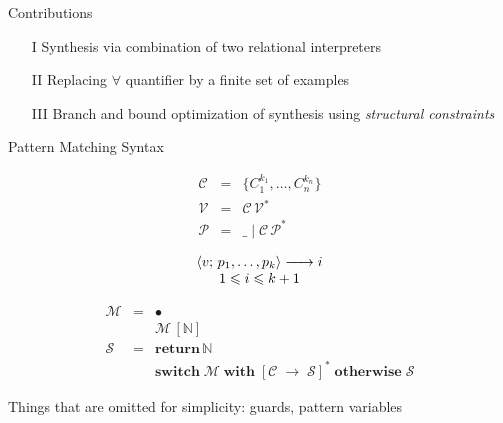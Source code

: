 \documentclass[aspectratio=169
  , xcolor={svgnames}
  , hyperref={ colorlinks,citecolor=Blue
             , linkcolor=DarkRed,urlcolor=DarkBlue}
  , russian
  ]{beamer}
\def\transarrow{\xrightarrow}
\def\padding{\phantom{X}}
\def\subarrow{}
\newcommand{\trans}[3]{{#1}\transarrow{\padding{\textstyle #2}\padding}\subarrow{#3}}
\newcommand{\inbr}[1]{\left<{#1}\right>}
\newcommand{\primi}[1]{\mathbf{#1}}
\newcommand{\ir}{\ensuremath{\mathcal{S}}}
\newcommand{\contributions}{
\begin{enumerate}
\item[I] Synthesis via combination of two relational interpreters
\item[II] Replacing $\forall$ quantifier by a finite set of examples
\item[III] Branch and bound optimization of synthesis using \emph{structural constraints}
\end{enumerate}
}
\begin{document}
\begin{frame}{Contributions}
\Large
\contributions
\end{frame}


\begin{frame}[fragile]{Pattern Matching Syntax}
\begin{figure}[ht]
\begin{subfigure}[t]{0.4\linewidth}
$$
 \begin{array}{rcll}
    \mathcal{C} & = & \{ C_1^{k_1}, \dots, C_n^{k_n} \}\\
    \mathcal{V} & = & \mathcal{C}\,\mathcal{V}^*\\  
    \mathcal{P} & = & \_ \mid \mathcal{C}\,\mathcal{P}^*
 \end{array}
$$
$$
 \begin{array}{c}
\trans{\inbr{v;\,p_1,\dots,p_k}}{}{i}\\
1\leqslant i\leqslant k+1
 \end{array}
$$
\end{subfigure}
\hspace{0.5cm}
\begin{subfigure}[t]{0.5\linewidth}
\[
\begin{array}{rcl}
  \mathcal M & = & \bullet \\
  &   & \mathcal M\,[\mathbb{N}] \\
  \ir & = & \primi{return}\,\mathbb{N} \\
  &   & \primi{switch}\;\mathcal{M}\;\primi{with}\; [\mathcal{C}\; \primi{\rightarrow}\; \ir]^*\;\primi{otherwise}\;\ir
\end{array}
\]
\end{subfigure}
\end{figure}
\vspace{0.5cm}
Things that are omitted for simplicity: guards, pattern variables

\end{frame}
\end{document}
